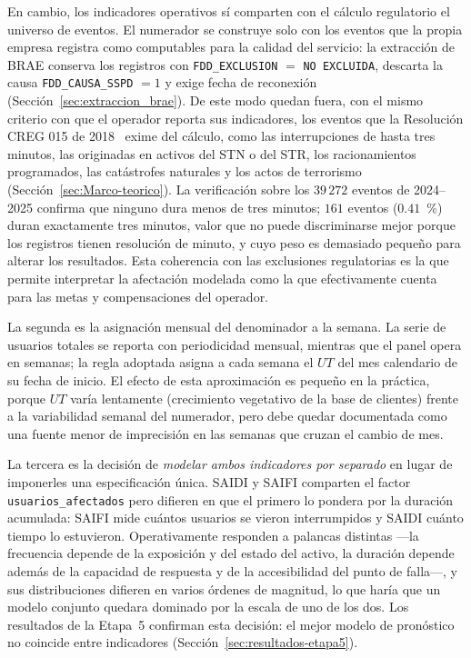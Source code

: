 En cambio, los indicadores operativos sí comparten con el cálculo regulatorio el universo de eventos. El numerador se construye solo con los eventos que la propia empresa registra como computables para la calidad del servicio: la extracción de BRAE conserva los registros con \texttt{FDD\_EXCLUSION} $=$ \texttt{NO EXCLUIDA}, descarta la causa \texttt{FDD\_CAUSA\_SSPD} $=1$ y exige fecha de reconexión (Sección~\ref{sec:extraccion_brae}). De este modo quedan fuera, con el mismo criterio con que el operador reporta sus indicadores, los eventos que la Resolución CREG 015 de 2018~\cite{ref1} exime del cálculo, como las interrupciones de hasta tres minutos, las originadas en activos del STN o del STR, los racionamientos programados, las catástrofes naturales y los actos de terrorismo (Sección~\ref{sec:Marco-teorico}). La verificación sobre los $39\,272$ eventos de 2024--2025 confirma que ninguno dura menos de tres minutos; $161$ eventos ($0{.}41$~\%) duran exactamente tres minutos, valor que no puede discriminarse mejor porque los registros tienen resolución de minuto, y cuyo peso es demasiado pequeño para alterar los resultados. Esta coherencia con las exclusiones regulatorias es la que permite interpretar la afectación modelada como la que efectivamente cuenta para las metas y compensaciones del operador.

La segunda es la asignación mensual del denominador a la semana. La serie de usuarios totales se reporta con periodicidad mensual, mientras que el panel opera en semanas; la regla adoptada asigna a cada semana el $UT$ del mes calendario de su fecha de inicio. El efecto de esta aproximación es pequeño en la práctica, porque $UT$ varía lentamente (crecimiento vegetativo de la base de clientes) frente a la variabilidad semanal del numerador, pero debe quedar documentada como una fuente menor de imprecisión en las semanas que cruzan el cambio de mes.

La tercera es la decisión de \textit{modelar ambos indicadores por separado} en lugar de imponerles una especificación única. SAIDI y SAIFI comparten el factor \texttt{usuarios\_afectados} pero difieren en que el primero lo pondera por la duración acumulada: SAIFI mide cuántos usuarios se vieron interrumpidos y SAIDI cuánto tiempo lo estuvieron. Operativamente responden a palancas distintas —la frecuencia depende de la exposición y del estado del activo, la duración depende además de la capacidad de respuesta y de la accesibilidad del punto de falla—, y sus distribuciones difieren en varios órdenes de magnitud, lo que haría que un modelo conjunto quedara dominado por la escala de uno de los dos. Los resultados de la Etapa~5 confirman esta decisión: el mejor modelo de pronóstico no coincide entre indicadores (Sección~\ref{sec:resultados-etapa5}).

